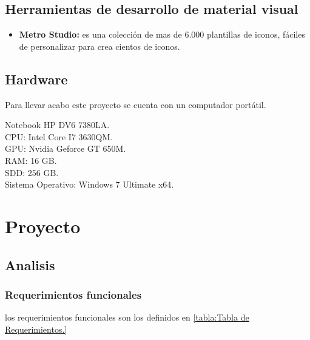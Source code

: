 \documentclass[letterpaper,12pt,openany,oneside]{book}
\begin{document}
\section{Herramientas de desarrollo de material visual}
\begin{itemize}
\item \textbf{Metro Studio:} es una colección de mas de 6.000 plantillas de iconos, fáciles de personalizar para crea cientos de iconos. 
\end{itemize}

\section{Hardware}

Para llevar acabo este proyecto se cuenta con un computador portátil.

Notebook HP DV6 7380LA.\\

CPU: Intel Core I7 3630QM.\\

GPU: Nvidia Geforce GT 650M.\\

RAM: 16 GB.\\

SDD: 256 GB.\\

Sistema Operativo: Windows 7 Ultimate x64.\\



\chapter{Proyecto}
\section{Analisis}
\newpage
\subsection{Requerimientos funcionales}

los requerimientos funcionales son los definidos en \ref{tabla:Tabla de Requerimientos.}
\end{document}
